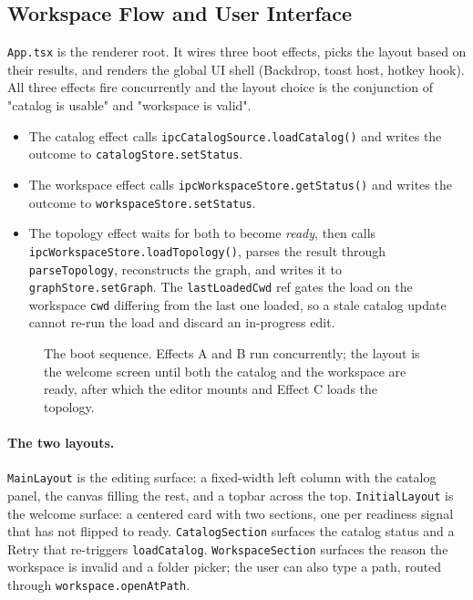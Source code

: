 \FloatBarrier

\subsection{Workspace Flow and User Interface}
\label{sec:workspace-ui}

\texttt{App.tsx} is the renderer root. It wires three boot effects, picks the layout based on their results, and renders the global UI shell (Backdrop, toast host, hotkey hook). All three effects fire concurrently and the layout choice is the conjunction of "catalog is usable" and "workspace is valid".

\begin{itemize}
    \item The catalog effect calls \texttt{ipcCatalogSource.loadCatalog()} and writes the outcome to \texttt{catalogStore.setStatus}.
    \item The workspace effect calls \texttt{ipcWorkspaceStore.getStatus()} and writes the outcome to \texttt{workspaceStore.setStatus}.
    \item The topology effect waits for both to become \textit{ready}, then calls \\ \texttt{ipcWorkspaceStore.loadTopology()}, parses the result through \texttt{parseTopology}, reconstructs the graph, and writes it to \texttt{graphStore.setGraph}. The \texttt{lastLoadedCwd} ref gates the load on the workspace \texttt{cwd} differing from the last one loaded, so a stale catalog update cannot re-run the load and discard an in-progress edit.
\end{itemize}

\begin{figure}[H]
    \centering
    \resizebox{0.82\textwidth}{!}{
        
    }
    \caption[The boot sequence.]{The boot sequence. Effects A and B run concurrently; the layout is the welcome screen until both the catalog and the workspace are ready, after which the editor mounts and Effect C loads the topology.}
    \label{fig:boot}
\end{figure}

\paragraph{The two layouts.}
\texttt{MainLayout} is the editing surface: a fixed-width left column with the catalog panel, the canvas filling the rest, and a topbar across the top. \texttt{InitialLayout} is the welcome surface: a centered card with two sections, one per readiness signal that has not flipped to ready. \texttt{CatalogSection} surfaces the catalog status and a Retry that re-triggers \texttt{loadCatalog}. \texttt{WorkspaceSection} surfaces the reason the workspace is invalid and a folder picker; the user can also type a path, routed through \texttt{workspace.openAtPath}.

